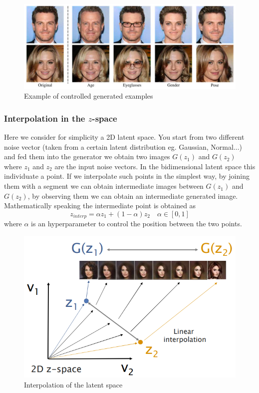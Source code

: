 \begin{figure}
    \centering
    \includegraphics[scale=0.7]{img/contGAN.png}
    \caption{Example of controlled generated examples}
\end{figure}

\subsubsection{Interpolation in the $z$-space}
Here we consider for simplicity a 2D latent space. You start from two different noise vector (taken from a certain latent distribution eg. Gaussian, Normal...) and fed them into the generator we obtain two images $G(z_1)$ and $G(z_2)$ where $z_1$ and $z_2$ are the input noise vectors. In the bidimensional latent space this individuate a point. If we interpolate such points in the simplest way, by joining them with a segment we can obtain intermediate images between $G(z_1)$ and $G(z_2)$, by observing them we can obtain an intermediate generated image. Mathematically speaking the intermediate point is obtained as
\begin{equation*}
    z_{interp}=\alpha z_1 + (1-\alpha) z_2 \quad \alpha \in [0,1]
\end{equation*}
where $\alpha$ is an hyperparameter to control the position between the two points.

\begin{figure}
    \centering
    \includegraphics[scale=0.8]{img/interpz.png}
    \caption{Interpolation of the latent space}
\end{figure}

